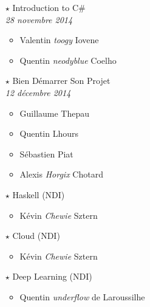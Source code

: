 \documentclass[a4paper]{article}
\begin{document}
\begin{itemize}
        \vspace{0.3cm}

    \item[$\star$] Introduction to C\#\\
        \emph{28 novembre 2014}
        \begin{itemize}
            \item Valentin \emph{toogy} Iovene
            \item Quentin \emph{neodyblue} Coelho
        \end{itemize}

        \vspace{0.3cm}

    \item[$\star$] Bien Démarrer Son Projet\\
        \emph{12 décembre 2014}
        \begin{itemize}
            \item Guillaume Thepau
            \item Quentin Lhours
            \item Sébastien Piat
            \item Alexis \emph{Horgix} Chotard
        \end{itemize}

        \vspace{0.3cm}

    \item[$\star$] Haskell (NDI)
        \begin{itemize}
            \item Kévin \emph{Chewie} Sztern
        \end{itemize}

        \vspace{0.3cm}

    \item[$\star$] Cloud (NDI)
        \begin{itemize}
            \item Kévin \emph{Chewie} Sztern
        \end{itemize}

        \vspace{0.3cm}

    \item[$\star$] Deep Learning (NDI)
        \begin{itemize}
            \item Quentin \emph{underflow} de Laroussilhe
        \end{itemize}


\end{itemize}
\end{document}

